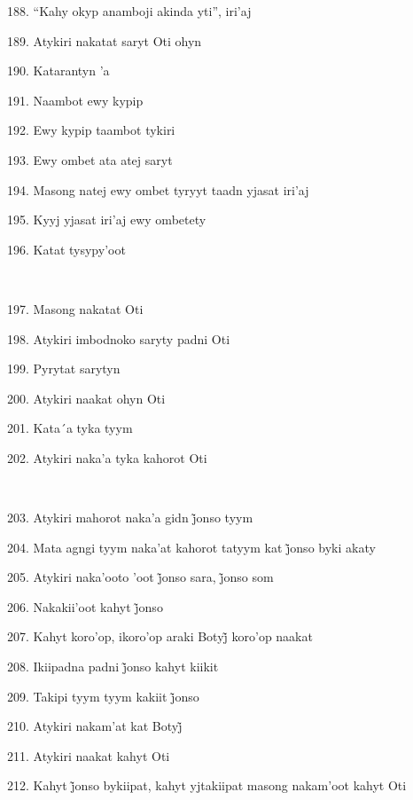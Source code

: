 188. ``Kahy okyp anamboji akinda yti'', iri'aj

189. Atykiri nakatat saryt Oti ohyn

190. Katarantyn 'a

191. Naambot ewy kypip

192. Ewy kypip taambot tykiri

193. Ewy ombet ata atej saryt

194. Masong natej ewy ombet tyryyt taadn yjasat iri'aj

195. Kyyj yjasat iri'aj ewy ombetety

196. Katat tysypy'oot

~

197. Masong nakatat Oti

198. Atykiri imbodnoko saryty padni Oti

199. Pyrytat sarytyn

200. Atykiri naakat ohyn Oti

201. Kata´a tyka tyym

202. Atykiri naka'a tyka kahorot Oti

~

203. Atykiri mahorot naka’a gidn j̃onso tyym

204. Mata agngi tyym naka’at kahorot tatyym kat j̃onso byki akaty

205. Atykiri naka’ooto ’oot j̃onso sara, j̃onso som

206. Nakakii’oot kahyt j̃onso

207. Kahyt koro’op, ikoro’op araki Botyj̃ koro’op naakat

208. Ikiipadna padni j̃onso kahyt kiikit

209. Takipi tyym tyym kakiit j̃onso

210. Atykiri nakam’at kat Botyj̃

211. Atykiri naakat kahyt Oti

212. Kahyt j̃onso bykiipat, kahyt yjtakiipat masong nakam’oot kahyt Oti

\endgroup

